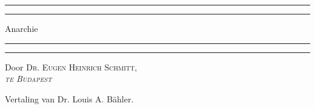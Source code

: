\documentclass[a4paper, 12pt, oneside, dutch]{article}
\begin{document}
\begin{titlepage} %
	\centering %
	\scshape %

	
	\rule{\textwidth}{1.6pt}\vspace*{-\baselineskip}\vspace*{2pt} %
	\rule{\textwidth}{0.4pt} %
	
	\vspace{0.75\baselineskip} %

        {\LARGE Anarchie \\} %
	
	\vspace{0.75\baselineskip} %
	
	\rule{\textwidth}{0.4pt}\vspace*{-\baselineskip}\vspace{3.2pt} %
	\rule{\textwidth}{1.6pt} %
	
	\vspace{1\baselineskip} %
	
	
	{Door \scshape\Large Dr. Eugen Heinrich Schmitt,\\\emph{te Budapest} \\} %
	
	\vspace*{1\baselineskip} %
	


	\vspace{1\baselineskip} %

        {\small Vertaling van Dr. Louis A. Bähler.}

	

\end{titlepage}
\end{document}
